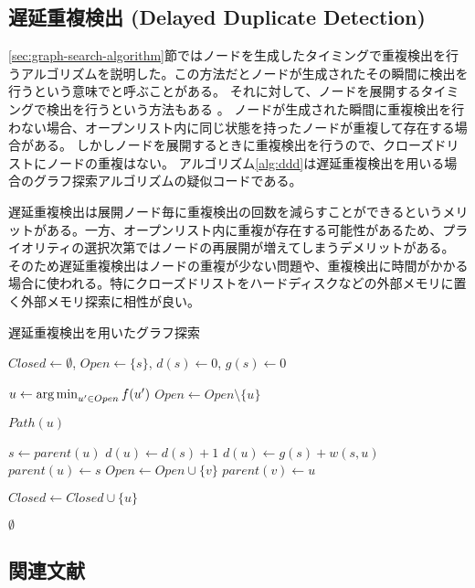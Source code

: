 \subsection{遅延重複検出 (Delayed Duplicate Detection)}
\label{sec:delayed-duplicate-detection}

\ref{sec:graph-search-algorithm}節ではノードを生成したタイミングで重複検出を行うアルゴリズムを説明した。この方法だとノードが生成されたその瞬間に検出を行うという意味でと呼ぶことがある。
それに対して、ノードを展開するタイミングで検出を行うという方法もある \cite{korf12003delayed}。
ノードが生成された瞬間に重複検出を行わない場合、オープンリスト内に同じ状態を持ったノードが重複して存在する場合がある。
しかしノードを展開するときに重複検出を行うので、クローズドリストにノードの重複はない。
アルゴリズム\ref{alg:ddd}は遅延重複検出を用いる場合のグラフ探索アルゴリズムの疑似コードである。

遅延重複検出は展開ノード毎に重複検出の回数を減らすことができるというメリットがある。一方、オープンリスト内に重複が存在する可能性があるため、プライオリティの選択次第ではノードの再展開が増えてしまうデメリットがある。
そのため遅延重複検出はノードの重複が少ない問題や、重複検出に時間がかかる場合に使われる。特にクローズドリストをハードディスクなどの外部メモリに置く外部メモリ探索に相性が良い。


\begin{algorithm}
\caption{遅延重複検出を用いたグラフ探索}
\label{alg:ddd}
	$Closed \leftarrow \emptyset$, $Open \leftarrow \{s\}$, $d(s) \leftarrow 0$, $g(s) \leftarrow 0$\;
	 {
                $u \leftarrow \operatorname*{arg\,min}_{u' \in Open} f(u')$ \;
	        $Open \leftarrow Open \setminus \{u\} $\;
          
		 {
			\Return $Path(u)$\;
		}

                $s \leftarrow parent(u)$\;
		 {
                  $d(u) \leftarrow d(s) + 1$\;
                  $d(u) \leftarrow g(s) + w(s, u)$\;
		  $parent(u) \leftarrow s$\;
		   {
		    $Open \leftarrow Open \cup \{v\}$\;
		    $parent(v) \leftarrow u$\;
		  }
		}

                 {
                  $Closed \leftarrow Closed \cup \{u\}$\;
                }
 	}
	\Return $\emptyset$\;
\end{algorithm}


\subsection{関連文献}




